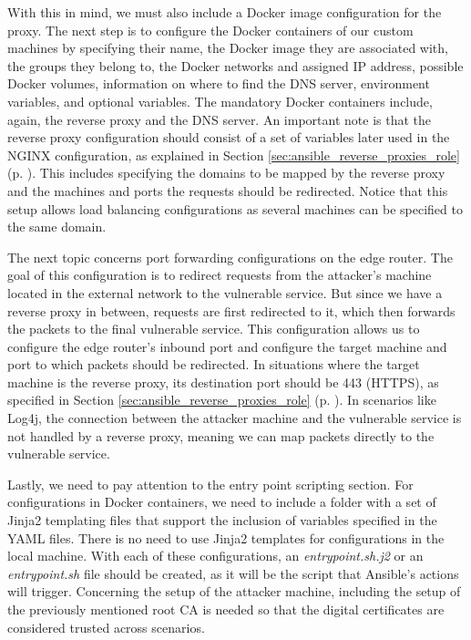 With this in mind, we must also include a Docker image configuration for the proxy. The next step is to configure the Docker containers of our custom machines by specifying their name, the Docker image they are associated with, the groups they belong to, the Docker networks and assigned IP address, possible Docker volumes, information on where to find the DNS server, environment variables, and optional variables. The mandatory Docker containers include, again, the reverse proxy and the DNS server. An important note is that the reverse proxy configuration should consist of a set of variables later used in the NGINX configuration, as explained in Section \ref{sec:ansible_reverse_proxies_role} (p. \pageref{sec:ansible_reverse_proxies_role}). This includes specifying the domains to be mapped by the reverse proxy and the machines and ports the requests should be redirected. Notice that this setup allows load balancing configurations as several machines can be specified to the same domain. 

The next topic concerns port forwarding configurations on the edge router. The goal of this configuration is to redirect requests from the attacker's machine located in the external network to the vulnerable service. But since we have a reverse proxy in between, requests are first redirected to it, which then forwards the packets to the final vulnerable service. This configuration allows us to configure the edge router's inbound port and configure the target machine and port to which packets should be redirected. In situations where the target machine is the reverse proxy, its destination port should be 443 (HTTPS), as specified in Section \ref{sec:ansible_reverse_proxies_role} (p. \pageref{sec:ansible_reverse_proxies_role}). In scenarios like Log4j, the connection between the attacker machine and the vulnerable service is not handled by a reverse proxy, meaning we can map packets directly to the vulnerable service.

Lastly, we need to pay attention to the entry point scripting section. For configurations in Docker containers, we need to include a folder with a set of Jinja2 templating files that support the inclusion of variables specified in the YAML files. There is no need to use Jinja2 templates for configurations in the local machine. With each of these configurations, an \textit{entrypoint.sh.j2} or an \textit{entrypoint.sh} file should be created, as it will be the script that Ansible's actions will trigger. Concerning the setup of the attacker machine, including the setup of the previously mentioned root CA is needed so that the digital certificates are considered trusted across scenarios.

